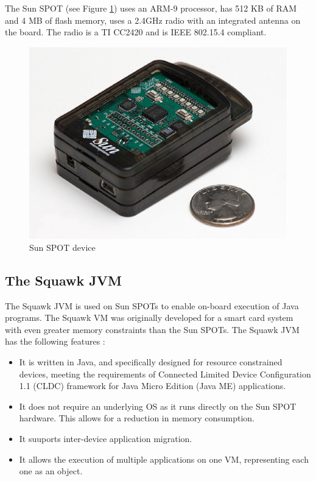 The Sun SPOT (see Figure \ref{Fig:SunSpot}) uses an ARM-9 processor, has 512 KB of RAM
and 4 MB of flash memory, uses a 2.4GHz radio with an integrated antenna on the board. The radio
is a TI CC2420 and is IEEE 802.15.4 compliant.

\begin{figure} 
\centering
\includegraphics[scale=0.50]{img/sunspot1.eps} 
\caption[Sun SPOT device]{Sun SPOT device}
\label{Fig:SunSpot}
\end{figure} 


\subsection{The Squawk JVM}

The Squawk JVM is used on Sun SPOTs to enable on-board execution of Java
programs. The Squawk VM was originally developed for a smart card system with
even greater memory constraints than the Sun SPOTs. The Squawk JVM has the
following features \cite{simon_squawk:2006}:

\begin{itemize}
  \item It is written in Java, and specifically designed for resource
  constrained devices, meeting the requirements of Connected Limited Device
  Configuration 1.1 (CLDC) framework for Java Micro Edition (Java ME)
  applications.
  \item It does not require an underlying OS as it runs directly on the Sun
  SPOT hardware. This allows for a reduction in memory consumption.
  \item It suuports inter-device application migration.
  \item It allows the execution of multiple applications on one VM,
  representing each one as an object.
\end{itemize}

